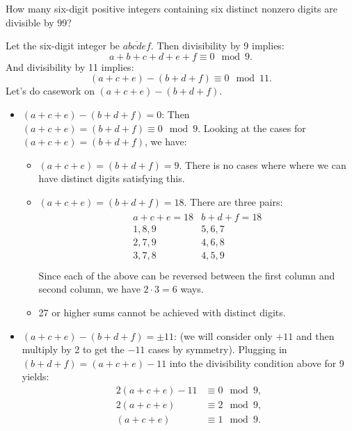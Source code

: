\documentclass[11pt,twoside]{scrartcl}
\begin{document}
\begin{problem}
    How many six-digit positive integers containing six distinct nonzero digits are divisible by 99?
    \begin{sketch}
        Let the six-digit integer be $\overline{abcdef}$. Then divisibility by 9 implies:
        \[a +b + c + d + e +f \equiv 0 \mod 9.\]
        And divisibility by 11 implies:
        \[(a+c+e)-(b+d+f) \equiv 0 \mod 11.\]
        Let's do casework on $(a+c+e)-(b+d+f)$.
        \begin{itemize}
            \item $(a+c+e)-(b+d+f) = 0$: Then $(a+c+e)=(b+d+f) \equiv 0 \mod 9$. Looking at the cases for $(a+c+e)=(b+d+f)$, we have:
            \begin{itemize}
                \item $(a+c+e)=(b+d+f)=9$. There is no cases where where we can have distinct digits satisfying this.
                \item $(a+c+e)=(b+d+f)=18$. There are three pairs:
                \begin{align*}
                    \begin{array}{c|c}
                        a+c+e=18 & b+d+f=18 \\ \hline
                        1,8,9 & 5,6,7 \\
                        2,7,9 & 4,6,8 \\
                        3,7,8 & 4,5,9 \\
                    \end{array}   
                \end{align*}
                Since each of the above can be reversed between the first column and second column, we have $2 \cdot 3 = 6$ ways. 
                \item 27 or higher sums cannot be achieved with distinct digits.
            \end{itemize}
            \item $(a+c+e)-(b+d+f) = \pm 11$: (we will consider only $+11$ and then multiply by 2 to get the $-11$ cases by symmetry). Plugging in $(b+d+f) = (a+c+e)-11$ into the divisibility condition above for 9 yields:
            \begin{align*}
                2(a+c+e) - 11 &\equiv 0 \mod 9, \\
                2(a+c+e) &\equiv 2 \mod 9, \\
                (a+c+e) &\equiv 1 \mod 9.
            \end{align*}

\end{itemize}
\end{sketch}
\end{problem}
\end{document}
